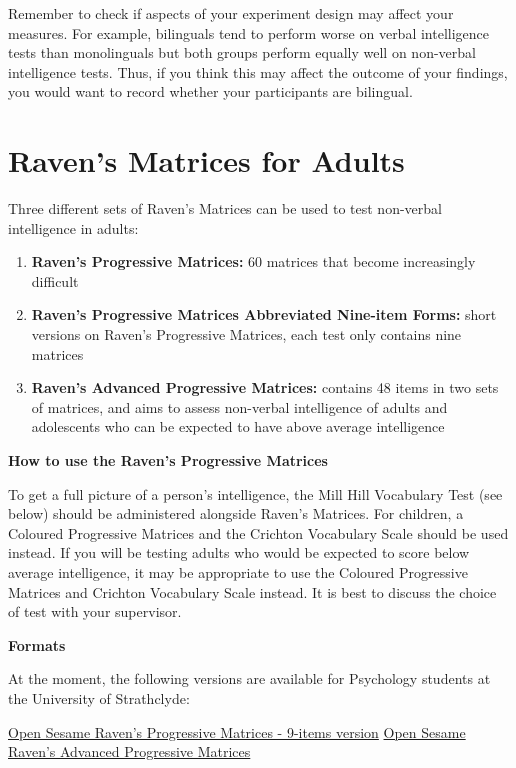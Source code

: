 \documentclass[
]{book}
\providecommand{\tightlist}{%
  \setlength{\itemsep}{0pt}\setlength{\parskip}{0pt}}
\begin{document}
Remember to check if aspects of your experiment design may affect your measures. For example, bilinguals tend to perform worse on verbal intelligence tests than monolinguals but both groups perform equally well on non-verbal intelligence tests. Thus, if you think this may affect the outcome of your findings, you would want to record whether your participants are bilingual.

\hypertarget{ravens-matrices-for-adults}{%
\section{Raven's Matrices for Adults}\label{ravens-matrices-for-adults}}

Three different sets of Raven's Matrices can be used to test non-verbal intelligence in adults:

\begin{enumerate}
\def\labelenumi{\arabic{enumi}.}
\tightlist
\item
  \textbf{Raven's Progressive Matrices:} 60 matrices that become increasingly difficult
\item
  \textbf{Raven's Progressive Matrices Abbreviated Nine-item Forms:} short versions on Raven's Progressive Matrices, each test only contains nine matrices
\item
  \textbf{Raven's Advanced Progressive Matrices:} contains 48 items in two sets of matrices, and aims to assess non-verbal intelligence of adults and adolescents who can be expected to have above average intelligence
\end{enumerate}

\textbf{How to use the Raven's Progressive Matrices}

To get a full picture of a person's intelligence, the Mill Hill Vocabulary Test (see below) should be administered alongside Raven's Matrices. For children, a Coloured Progressive Matrices and the Crichton Vocabulary Scale should be used instead. If you will be testing adults who would be expected to score below average intelligence, it may be appropriate to use the Coloured Progressive Matrices and Crichton Vocabulary Scale instead. It is best to discuss the choice of test with your supervisor.

\textbf{Formats}

At the moment, the following versions are available for Psychology students at the University of Strathclyde:

\href{link\%20to\%20file}{Open Sesame Raven's Progressive Matrices - 9-items version} \textbar{} \href{link\%20to\%20file}{Open Sesame Raven's Advanced Progressive Matrices}
\end{document}
